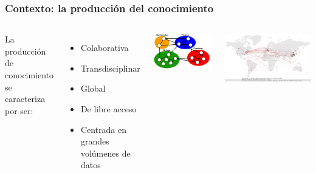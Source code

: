 \begin{frame}[fragile]
\frametitle{Contexto: la producción del conocimiento}
\begin{columns}[c] %

La producción de conocimiento se caracteriza por ser: 
\begin{itemize}
\item Colaborativa
\item Transdisciplinar
\item Global
\item De libre acceso
\item Centrada en grandes volúmenes de datos
\end{itemize}


\begin{center}
\includegraphics[scale=0.18]{imagenes/Network-of-Scientists3.png}
\end{center}

\begin{center}
\includegraphics[scale=0.18]{imagenes/covid19_collab.png}
\end{center}
\end{columns}
\vspace{0.25cm}


\end{frame}
